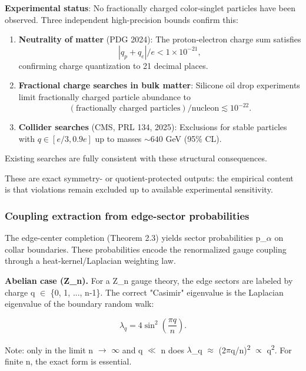 \textbf{Experimental status}: No fractionally charged color-singlet particles have been observed. Three independent high-precision bounds confirm this:

\begin{enumerate}
\def\labelenumi{\arabic{enumi}.}
\item
  \textbf{Neutrality of matter} (PDG 2024): The proton-electron charge sum satisfies \[|q_p + q_e|/e < 1 \times 10^{-21},\] confirming charge quantization to 21 decimal places.
\item
  \textbf{Fractional charge searches in bulk matter}: Silicone oil drop experiments limit fractionally charged particle abundance to \[(\text{fractionally charged particles})/\text{nucleon} \lesssim 10^{-22}.\]
\item
  \textbf{Collider searches} (CMS, PRL 134, 2025): Exclusions for stable particles with \(q \in [e/3, 0.9e]\) up to masses \(\sim 640\) GeV (95\% CL).
\end{enumerate}

Existing searches are fully consistent with these structural consequences.

These are exact symmetry- or quotient-protected outputs: the empirical content is that violations remain excluded up to available experimental sensitivity.

\subsubsection{Coupling extraction from edge-sector probabilities}\label{613-coupling-extraction-from-edge-sector-probabilities}

The edge-center completion (Theorem 2.3) yields sector probabilities p\_\ensuremath{\alpha} on collar boundaries. These probabilities encode the renormalized gauge coupling through a heat-kernel/Laplacian weighting law.

\textbf{Abelian case (Z\_n).} For a Z\_n gauge theory, the edge sectors are labeled by charge q \ensuremath{\in} \{0, 1, ..., n-1\}. The correct "Casimir" eigenvalue is the Laplacian eigenvalue of the boundary random walk:

\[
\lambda_q = 4 \sin^2\left(\frac{\pi q}{n}\right).
\]

Note: only in the limit n \ensuremath{\to} \ensuremath{\infty} and q \ensuremath{\ll} n does \ensuremath{\lambda}\_q \ensuremath{\approx} (2\ensuremath{\pi}q/n)\textsuperscript{2} \ensuremath{\propto} q\textsuperscript{2}. For finite n, the exact form is essential.

